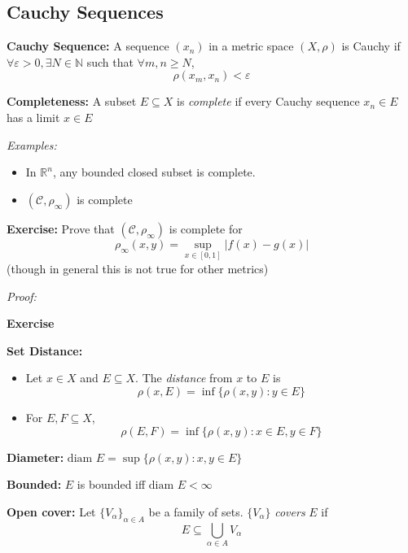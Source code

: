 \documentclass[12pt]{report}
\newcommand{\R}{\mathbb{R}}
\newcommand{\N}{\mathbb{N}}
\newcommand{\abs}[1]{\left\vert #1 \right\vert}
\newcommand{\ep}{\varepsilon}
\newcommand{\sub}{\subseteq}
\newcommand{\diam}{\text{diam }}
\newenvironment*{tbox}[2][gray]{
    \begin{tcolorbox}[
        parbox=false,
        colback=#1!5!white,
        colframe=#1!75!black,
        breakable,
        title={#2}
    ]}
    {\end{tcolorbox}}
\newenvironment*{exercise}[1][red]{
    \begin{tcolorbox}[
        parbox=false,
        colback=#1!5!white,
        colframe=#1!75!black,
        breakable
    ]}
    {\end{tcolorbox}}
\begin{document}
\subsection*{Cauchy Sequences}
    \textbf{Cauchy Sequence:} A sequence $(x_n)$ in a metric space $(X, \rho)$ is Cauchy if $\forall \ep > 0, \exists N \in \N$ such that $\forall m, n \geq N$,
    \[\rho(x_m, x_n) < \ep\]

    \textbf{Completeness:} A subset $E \sub X$ is \emph{complete} if every Cauchy sequence $x_n \in E$ has a limit $x \in E$

    \emph{Examples:} 
    \begin{itemize}
        \item In $\R^n$, any bounded closed subset is complete. 
        \item $(\mathcal C, \rho_{\infty})$ is complete 
    \end{itemize}

    \begin{exercise}
        \textbf{Exercise:} Prove that $(\mathcal C, \rho_{\infty})$ is complete for 
        \[\rho_{\infty}(x, y) = \sup_{x \in [0,1]} \abs{f(x) - g(x)}\] 
        (though in general this is not true for other metrics)
    \end{exercise}
    
    \begin{tbox}{\textbf{Proposition:} A closed subset $(X, \rho)$ of a complete metric space is complete and complete subsets of a metric space must be closed}
        \emph{Proof:} 
        
        \begin{exercise}
            \textbf{Exercise}
        \end{exercise}
    \end{tbox}

    \textbf{Set Distance:}
    \begin{itemize}
        \item Let $x \in X$ and $E \sub X$. The \emph{distance} from $x$ to $E$ is
        \[\rho(x, E) = \inf\{\rho(x, y): y \in E\}\] 
        \item For $E, F \sub X$, 
        \[\rho(E, F) = \inf\{\rho(x, y): x \in E, y \in F\}\]
    \end{itemize}

    \textbf{Diameter:} $\diam E = \sup\{\rho(x, y): x, y \in E\}$

    \textbf{Bounded:} $E$ is bounded iff $\diam E < \infty$

    \textbf{Open cover:} Let $\{V_{\alpha}\}_{\alpha \in A}$ be a family of sets. $\{V_{\alpha}\}$ \emph{covers} $E$ if 
    \[E \sub \bigcup_{\alpha \in A} V_{\alpha}\]
\end{document}
